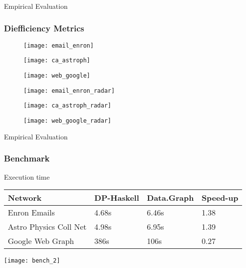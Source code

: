 \begin{frame}[fragile]{Empirical Evaluation}
  \frametitle{Diefficiency Metrics}
    \begin{figure}[!htb]
      \centering
      \begin{minipage}{0.33\textwidth}
       \texttt{[image: email\_enron]}
      \end{minipage}%
      \begin{minipage}{0.33\textwidth}
       \texttt{[image: ca\_astroph]}
      \end{minipage}%
      \begin{minipage}{0.33\textwidth}
       \texttt{[image: web\_google]}
      \end{minipage}
  \end{figure}
\begin{figure}[!htb]
    \centering
    \begin{minipage}{0.33\textwidth}
     \texttt{[image: email\_enron\_radar]}
    \end{minipage}%
    \begin{minipage}{0.33\textwidth}
     \texttt{[image: ca\_astroph\_radar]}
    \end{minipage}%
    \begin{minipage}{0.33\textwidth}
     \texttt{[image: web\_google\_radar]}
    \end{minipage}
\end{figure}
\end{frame}

\begin{frame}[fragile]{Empirical Evaluation}
  \frametitle{Benchmark}

  \begin{block}{Execution time}
  \begin{table}[H]
    \centering
    \begin{tabular}{|l|l|l|l|}
     \hline
     \textbf{Network} & \textbf{DP-Haskell} & \textbf{Data.Graph} & \textbf{Speed-up}\\
     \hline
     Enron Emails & 4.68s &  6.46s & 1.38\\
     \hline
     Astro Physics Coll Net & 4.98s & 6.95s  & 1.39\\
     \hline
     Google Web Graph & 386s & 106s & \color{red}0.27\\
     \hline
    \end{tabular}
   \end{table}      
  \end{block}

   \vspace{1cm}

  \begin{minipage}[t]{\linewidth}
    \texttt{[image: bench\_2]}
  \end{minipage}
\end{frame}

